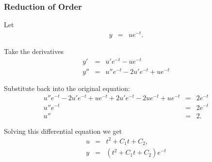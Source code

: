 \documentclass{beamer}
\newcommand{\lp}{\left(}
\newcommand{\rp}{\right)}
\begin{document}
\begin{frame}
  \frametitle{Reduction of Order}

  Let 
  \begin{eqnarray*}
    y & = & u e^{-t}.
  \end{eqnarray*}

  Take the derivatives
  \begin{eqnarray*}
    y' & = & u' e^{-t} - u e^{-t} \\
    y'' & = & u'' e^{-t} - 2 u' e^{-t} + u e^{-t}
  \end{eqnarray*}

  Substitute back into the original equation:
  \begin{eqnarray*}
    u'' e^{-t} - 2 u' e^{-t} + u e^{-t} + 2 u' e^{-t} - 2ue^{-t} + u e^{-t} & = & 2 e^{-t}    \\
    u'' e^{-t} & = & 2 e^{-t} \\
    u'' & = & 2.
  \end{eqnarray*}

\end{frame}

\begin{frame}

  Solving this differential equation we get
  \begin{eqnarray*}
    u & = & t^2 + C_1 t + C_2, \\
    y & = & \lp  t^2 + C_1 t + C_2 \rp e^{-t}
  \end{eqnarray*}
  
\end{frame}
\end{document}
